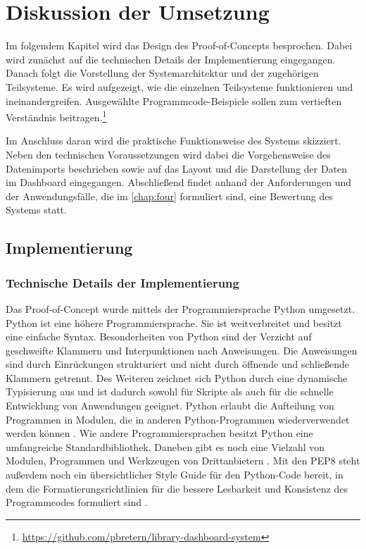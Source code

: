 \chapter{Diskussion der Umsetzung}
\label{chap:five}
Im folgendem Kapitel wird das Design des Proof-of-Concepts besprochen. Dabei wird zunächst auf die technischen Details der
Implementierung eingegangen. Danach folgt die Vorstellung der Systemarchitektur und der zugehörigen Teilsysteme.
Es wird aufgezeigt, wie die einzelnen Teilsysteme funktionieren und ineinandergreifen. Ausgewählte Programmcode-Beispiele sollen zum  
vertieften Verständnis beitragen.\footnote{\url{https://github.com/pbretern/library-dashboard-system}}

Im Anschluss daran wird die praktische Funktionsweise des Systems skizziert. Neben den technischen Voraussetzungen wird dabei 
die Vorgehensweise des Datenimports beschrieben sowie auf das Layout und die Darstellung der Daten im Dashboard eingegangen. 
Abschließend findet anhand der Anforderungen und der Anwendungsfälle, die im \autoref{chap:four} formuliert sind, eine Bewertung des Systems statt.


\section{Implementierung}
    
    \subsection{Technische Details der Implementierung}
    Das Proof-of-Concept wurde mittels der Programmiersprache Python umgesetzt.
    Python ist eine höhere Programmiersprache. Sie ist weitverbreitet \cite[vgl.][]{loukides_where_2021} und besitzt
    eine einfache Syntax. Besonderheiten von Python sind der Verzicht auf geschweifte Klammern und Interpunktionen nach Anweisungen.
    Die Anweisungen sind durch Einrückungen strukturiert und nicht durch öffnende und schließende Klammern
    getrennt. Des Weiteren zeichnet sich Python durch eine dynamische Typisierung aus und ist dadurch sowohl für Skripte als auch 
    für die schnelle Entwicklung von Anwendungen geeignet. Python erlaubt die Aufteilung von Programmen in Modulen, die in anderen Python-Programmen wiederverwendet werden können
    \cite[vgl.][]{python_6_2021}.
    Wie andere Programmiersprachen besitzt Python eine umfangreiche Standardbibliothek.
    Daneben gibt es noch eine Vielzahl von Modulen, Programmen und Werkzeugen von Drittanbietern \cite[vgl.][]{python_pypi_2021}.
    Mit den \acrfull{PEP8} steht außerdem noch ein übersichtlicher Style Guide für den Python-Code bereit, in dem die Formatierungsrichtlinien für die bessere Lesbarkeit und Konsistenz des Programmcodes formuliert sind \cite[vgl.][]{rossum_pep_2021}.

